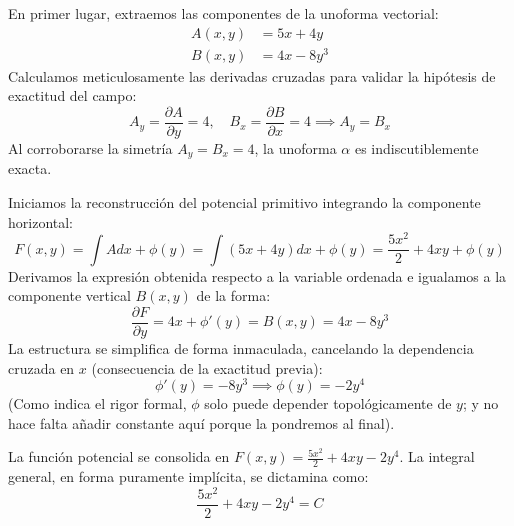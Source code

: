 \documentclass[11pt,a4paper]{article}
\theoremstyle{definition}
\theoremstyle{plain}
\begin{document}
\begin{tcolorbox}
En primer lugar, extraemos las componentes de la unoforma vectorial:
\begin{align*}
    A(x,y) &= 5x + 4y \\
    B(x,y) &= 4x - 8y^3 
\end{align*}
Calculamos meticulosamente las derivadas cruzadas para validar la hipótesis de exactitud del campo:
$$ A_y = \frac{\partial A}{\partial y} = 4, \quad B_x = \frac{\partial B}{\partial x} = 4 \implies A_y = B_x $$
Al corroborarse la simetría $A_y = B_x = 4$, la unoforma $\alpha$ es indiscutiblemente exacta.

Iniciamos la reconstrucción del potencial primitivo integrando la componente horizontal:
$$ F(x,y) = \int A dx + \phi(y) = \int (5x + 4y)dx + \phi(y) = \frac{5x^2}{2} + 4xy + \phi(y) $$
Derivamos la expresión obtenida respecto a la variable ordenada e igualamos a la componente vertical $B(x,y)$ de la forma:
$$ \frac{\partial F}{\partial y} = 4x + \phi'(y) = B(x,y) = 4x - 8y^3 $$
La estructura se simplifica de forma inmaculada, cancelando la dependencia cruzada en $x$ (consecuencia de la exactitud previa):
$$ \phi'(y) = -8y^3 \implies \phi(y) = -2y^4 $$
(Como indica el rigor formal, $\phi$ solo puede depender topológicamente de $y$; y no hace falta añadir constante aquí porque la pondremos al final).

La función potencial se consolida en $F(x,y) = \frac{5x^2}{2} + 4xy - 2y^4$.
La integral general, en forma puramente implícita, se dictamina como:
$$ \frac{5x^2}{2} + 4xy - 2y^4 = C $$

\begin{figure}[H]
    \centering
\end{figure}
\end{tcolorbox}
\end{document}
